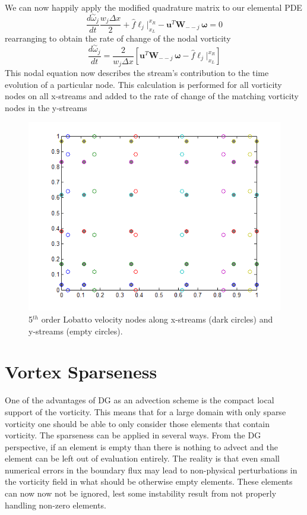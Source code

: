 \documentclass[letterpaper,12pt]{report}
\newcommand{\ben}[1]{\begin{equation}\label{#1}}
\newcommand{\ee}{\end{equation}}
\newcommand{\aomega}{\overset{\sim}{\omega}}				%
\begin{document}
We can now happily apply the modified quadrature matrix to our elemental PDE
\ben{DGJoshTemp3} \frac{d \aomega_j}{dt} \frac{w_j \Delta x}{2}
+\hat{f}\ell_j \Big|^{x_R}_{x_L} 
- \mathbf{u}^T \mathbf{W}_{--j} \, \boldsymbol{\omega} = 0 \ee
rearranging to obtain the rate of change of the nodal vorticity
\ben{DGJosh} \frac{d \aomega_j}{dt}
=\frac{2}{w_j \Delta x} \left[\mathbf{u}^T \mathbf{W}_{--j} \, \boldsymbol{\omega} - \hat{f}\ell_j \Big|^{x_R}_{x_L}\right]  \ee
This nodal equation now describes the stream's contribution to the time evolution of a particular node. This calculation is performed for all vorticity nodes on all x-streams and added to the rate of change of the matching vorticity nodes in the y-streams

\begin{figure}
\centering
\includegraphics[width=5.5in]{VelocityLobatto.PNG}
\caption{\label{fig:VelocityLobatto}5$^{th}$ order Lobatto velocity nodes along x-streams (dark circles) and y-streams (empty circles).}
\end{figure}

%
\section{Vortex Sparseness}
One of the advantages of DG as an advection scheme is the compact local support of the vorticity. This means that for a large domain with only sparse vorticity one should be able to only consider those elements that contain vorticity. The sparseness can be applied in several ways. From the DG perspective, if an element is empty than there is nothing to advect and the element can be left out of evaluation entirely. The reality is that even small numerical errors in the boundary flux may lead to non-physical perturbations in the vorticity field in what should be otherwise empty elements. These elements can now now not be ignored, lest some instability result from not properly handling non-zero elements.
\end{document}
